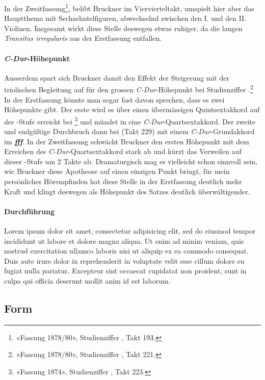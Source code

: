 In der Zweitfassung\footnote{«Fassung 1878/80», Studienziffer , Takt 193.}, belibt Bruckner im Viervierteltakt, umspielt hier aber das Hauptthema mit Sechzehntelfiguren, abwechselnd zwischen den I. und den II. Violinen.
Insgesamt wirkt diese Stelle deswegen etwas ruhiger, da die langen \emph{Transitus irregularis} aus der Erstfassung entfallen.

\paragraph{\emph{C-Dur}-Höhepunkt}

Ausserdem spart sich Bruckner damit den Effekt der Steigerung mit der triolischen Begleitung auf für den grossen \emph{C-Dur}-Höhepunkt bei Studienziffer .\footnote{«Fassung 1878/80», Studienziffer , Takt 221.}
In der Erstfassung könnte man sogar fast davon sprechen, dass es zwei Höhepunkte gibt.
Der erste wird es über einen übermässigen Quintsextakkord auf der -Stufe erreicht bei \footnote{«Fassung 1874», Studienziffer , Takt 223.} und mündet in eine \emph{C-Dur}-Quartsextakkord.
Der zweite und endgültige Durchbruch dann bei  (Takt 229) mit einem \emph{C-Dur}-Grundakkord im \emph{\textbf{fff}}.
In der Zweitfassung schwächt Bruckner den ersten Höhepunkt mit dem Erreichen des \emph{C-Dur}-Quartsextakkord stark ab und kürzt das Verweilen auf dieser -Stufe um 2 Takte ab.
Dramaturgisch mag es vielleicht schon sinnvoll sein, wie Bruckner diese Apotheose auf einen einzigen Punkt bringt, für mein persönliches Hörempfinden hat diese Stelle in der Erstfassung deutlich mehr Kraft und klingt deswegen als Höhepunkt des Satzes deutlich überwältigender.


\paragraph{Durchführung}

Lorem ipsum dolor sit amet, consectetur adipisicing elit, sed do eiusmod tempor incididunt ut labore et dolore magna aliqua. Ut enim ad minim veniam, quis nostrud exercitation ullamco laboris nisi ut aliquip ex ea commodo consequat. Duis aute irure dolor in reprehenderit in voluptate velit esse cillum dolore eu fugiat nulla pariatur. Excepteur sint occaecat cupidatat non proident, sunt in culpa qui officia deserunt mollit anim id est laborum.


\subsection{Form}


